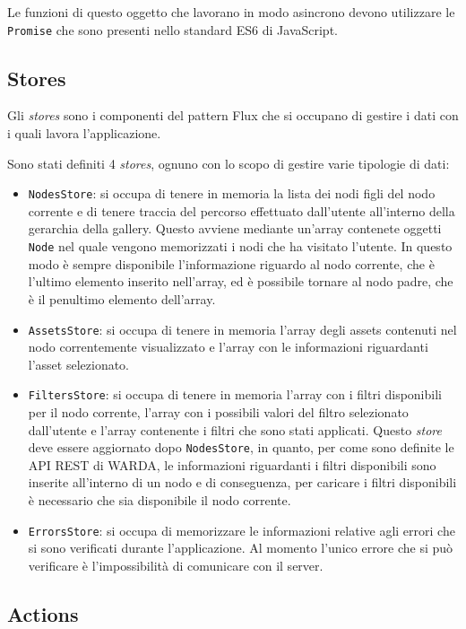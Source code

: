 Le funzioni di questo oggetto che lavorano in modo asincrono devono utilizzare le \texttt{Promise} che sono presenti nello standard ES6 di JavaScript.

\subsection{Stores}

Gli \textit{stores} sono i componenti del pattern Flux che si occupano di gestire i dati con i quali lavora l'applicazione. 

Sono stati definiti 4 \textit{stores}, ognuno con lo scopo di gestire varie tipologie di dati:
\begin{itemize}
\item \texttt{NodesStore}: si occupa di tenere in memoria la lista dei nodi figli del nodo corrente e di tenere traccia del percorso effettuato dall'utente all'interno della gerarchia della gallery. Questo avviene mediante un'array contenete oggetti \texttt{Node} nel quale vengono memorizzati i nodi che ha visitato l'utente. In questo modo è sempre disponibile l'informazione riguardo al nodo corrente, che è l'ultimo elemento inserito nell'array, ed è possibile tornare al nodo padre, che è il penultimo elemento dell'array.
\item \texttt{AssetsStore}: si occupa di tenere in memoria l'array degli assets contenuti nel nodo correntemente visualizzato e l'array con le informazioni riguardanti l'asset selezionato.
\item \texttt{FiltersStore}: si occupa di tenere in memoria l'array con i filtri disponibili per il nodo corrente, l'array con i possibili valori del filtro selezionato dall'utente e l'array contenente i filtri che sono stati applicati. Questo \textit{store} deve essere aggiornato dopo \texttt{NodesStore}, in quanto, per come sono definite le API REST di WARDA, le informazioni riguardanti i filtri disponibili sono inserite all'interno di un nodo e di conseguenza, per caricare i filtri disponibili è necessario che sia disponibile il nodo corrente.
\item \texttt{ErrorsStore}: si occupa di memorizzare le informazioni relative agli errori che si sono verificati durante l'applicazione. Al momento l'unico errore che si può verificare è l'impossibilità di comunicare con il server.
\end{itemize}

\subsection{Actions}

